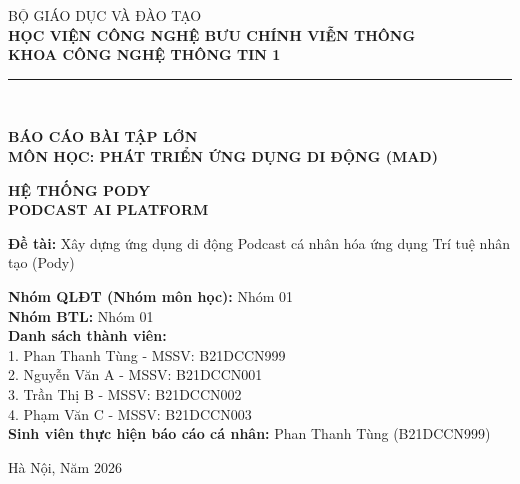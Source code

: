 \documentclass[12pt,a4paper]{report}
\begin{document}
\begin{titlepage}
\begin{center}
    \large BỘ GIÁO DỤC VÀ ĐÀO TẠO \\
    \large \textbf{HỌC VIỆN CÔNG NGHỆ BƯU CHÍNH VIỄN THÔNG} \\
    \large \textbf{KHOA CÔNG NGHỆ THÔNG TIN 1} \\
    \vspace{1cm}
    \rule{6cm}{1pt} \\
    \vspace{2cm}
    
    \Large \textbf{BÁO CÁO BÀI TẬP LỚN} \\
    \Large \textbf{MÔN HỌC: PHÁT TRIỂN ỨNG DỤNG DI ĐỘNG (MAD)} \\
    \vspace{1.5cm}
    
    \Huge \textbf{HỆ THỐNG PODY} \\
    \Huge \textbf{PODCAST AI PLATFORM} \\
    \vspace{1.5cm}
    
    \large \textbf{Đề tài:} Xây dựng ứng dụng di động Podcast cá nhân hóa ứng dụng Trí tuệ nhân tạo (Pody) \\
    \vspace{2.5cm}
    
    \begin{flushleft}
    \large \textbf{Nhóm QLĐT (Nhóm môn học):} Nhóm 01 \\
    \large \textbf{Nhóm BTL:} Nhóm 01 \\
    \large \textbf{Danh sách thành viên:} \\
    \hspace{0.5cm} 1. Phan Thanh Tùng - MSSV: B21DCCN999 \\
    \hspace{0.5cm} 2. Nguyễn Văn A - MSSV: B21DCCN001 \\
    \hspace{0.5cm} 3. Trần Thị B - MSSV: B21DCCN002 \\
    \hspace{0.5cm} 4. Phạm Văn C - MSSV: B21DCCN003 \\
    \vspace{0.5cm}
    \large \textbf{Sinh viên thực hiện báo cáo cá nhân:} Phan Thanh Tùng (B21DCCN999)
    \end{flushleft}
    
    \vfill
    \large Hà Nội, Năm 2026
\end{center}
\end{titlepage}
\end{document}
